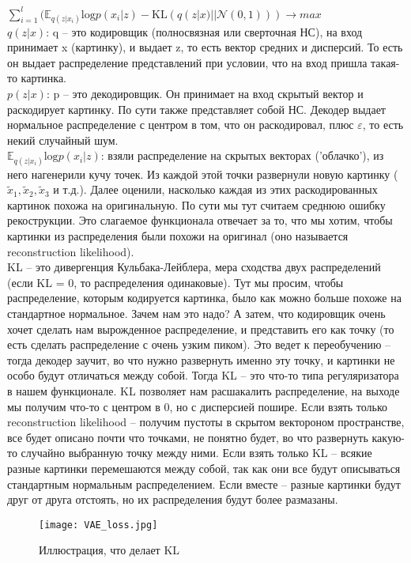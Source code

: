 $\sum\limits^{l}_{i = 1}(\mathbb{E}_{q(z|x_{i})}\text{log} p(x_{i} | z) - \text{KL}(q(z|x) || \mathcal{N}(0,1))) \rightarrow max$ \\ 

$q(z|x)$: q -- это кодировщик (полносвязная или сверточная НС), на вход принимает x (картинку), и выдает z, то есть вектор средних и дисперсий. То есть он выдает распределение представлений при условии, что на вход пришла такая-то картинка. \\ 

$p(z|x)$: p -- это декодировщик. Он принимает на вход скрытый вектор и раскодирует картинку. По сути также представляет собой НС. Декодер выдает нормальное распределение с центром в том, что он раскодировал, плюс $\varepsilon$, то есть некий случайный шум.\\ 

$\mathbb{E}_{q(z|x_{i})}\text{log} p(x_{i} | z)$: взяли распределение на скрытых векторах ('облачко'), из него нагенерили кучу точек. Из каждой этой точки развернули новую картинку ($\tilde x_{1}, \tilde x_{2}, \tilde x_{3}$ и т.д.). Далее оценили, насколько каждая из этих раскодированных картинок похожа на оригинальную. По сути мы тут считаем среднюю ошибку рекострукции. Это слагаемое функционала отвечает за то, что мы хотим, чтобы картинки из распределения были похожи на оригинал (оно называется reconstruction likelihood). \\ 

KL -- это дивергенция Кульбака-Лейблера, мера сходства двух распределений (если KL = 0, то распределения одинаковые). Тут мы просим, чтобы распределение, которым кодируется картинка, было как можно больше похоже на стандартное нормальное. Зачем нам это надо? А затем, что кодировщик очень хочет сделать нам вырожденное распределение, и представить его как точку (то есть сделать распределение с очень узким пиком). Это ведет к переобучению -- тогда декодер заучит, во что нужно развернуть именно эту точку, и картинки не особо будут отличаться между собой. Тогда KL -- это что-то типа регуляризатора в нашем функционале. KL позволяет нам расшакалить распределение, на выходе мы получим что-то с центром в 0, но с дисперсией пошире. Если взять только reconstruction likelihood -- получим пустоты в скрытом вектороном пространстве, все будет описано почти что точками, не понятно будет, во что развернуть какую-то случайно выбранную точку между ними. Если взять только KL -- всякие разные картинки перемешаются между собой, так как они все будут описываться стандартным нормальным распределением. Если вместе -- разные картинки будут друг от друга отстоять, но их распределения будут более размазаны. \\ 

\begin{figure}[H]
	\centering
	\texttt{[image: VAE\_loss.jpg]}
	\caption{Иллюстрация, что делает KL}
\end{figure}
